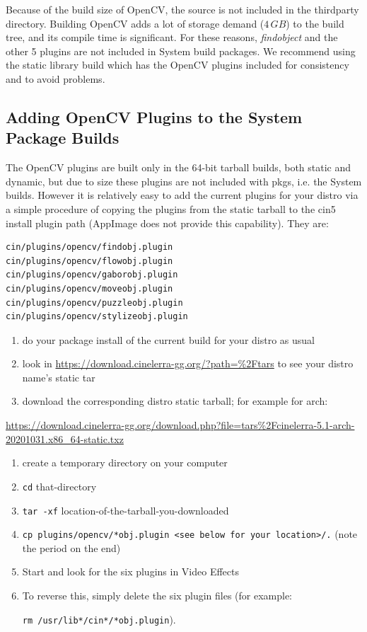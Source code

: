 Because of the build size of OpenCV, the source is not included in the thirdparty directory.
Building OpenCV adds a lot of storage demand ($4\,GB$) to the \CGG{} build tree, and its compile
time is significant. For these reasons, \textit{findobject} and the other 5 plugins are not
included in System build packages.  We recommend using the static library build which has the OpenCV
plugins included for consistency and to avoid problems.

\subsection{Adding OpenCV Plugins to the System Package Builds}%
\label{sub:adding_opencv_to_system_builds}

The OpenCV plugins are built only in the 64-bit tarball builds, both static and dynamic, but due
to size these plugins are not included with pkgs, i.e. the System builds. However it is relatively
easy to add the current plugins for your distro via a simple procedure of copying the plugins
from the static tarball to the cin5 install plugin path (AppImage does not provide this capability). They are:

\begin{lstlisting}[style=sh]
cin/plugins/opencv/findobj.plugin
cin/plugins/opencv/flowobj.plugin
cin/plugins/opencv/gaborobj.plugin
cin/plugins/opencv/moveobj.plugin
cin/plugins/opencv/puzzleobj.plugin
cin/plugins/opencv/stylizeobj.plugin
\end{lstlisting}

\begin{enumerate}
    \item do your package install of the current build for your distro as usual
    \item look in {\small \url{https://download.cinelerra-gg.org/?path=\%2Ftars}} to see your distro name's static tar
    \item download the corresponding distro static tarball;
    for example for arch:
\end{enumerate}

    {\small \url{https://download.cinelerra-gg.org/download.php?file=tars\%2Fcinelerra-5.1-arch-20201031.x86_64-static.txz}}

\begin{enumerate}[resume]
    \item create a temporary directory on your computer
    \item \texttt{cd} that-directory
    \item \texttt{tar -xf} location-of-the-tarball-you-downloaded
    \item \texttt{cp plugins/opencv/*obj.plugin <see below for your location>/.} (note the period on the end)
    \item Start \CGG{} and look for the six plugins in Video Effects
    \item To reverse this, simply delete the six plugin files (for example:

    \texttt{rm /usr/lib*/cin*/*obj.plugin}).
\end{enumerate}

